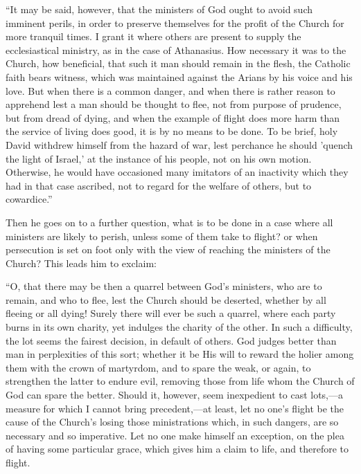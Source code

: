 ``It may be said, however, that the ministers of God ought to
avoid such imminent perils, in order to preserve themselves for the
profit of the Church for more tranquil times. I grant it where others
are present to supply the ecclesiastical
ministry, as in the case of Athanasius. How necessary it was to the
Church, how beneficial, that such it man should remain in the flesh,
the Catholic faith bears witness, which was maintained against the
Arians by his voice and his love. But when there is a common danger,
and when there is rather reason to apprehend lest a man should be
thought to flee, not from purpose of prudence, but from dread of
dying, and when the example of flight does more harm than the service
of living does good, it is by no means to be done. To be brief, holy
David withdrew himself from the hazard of war, lest perchance he
should 'quench the light of Israel,' at the instance of his people,
not on his own motion. Otherwise, he would have occasioned many
imitators of an inactivity which they had in that case ascribed, not
to regard for the welfare of others, but to cowardice.''

Then he goes on to a further question, what is to be done in a case
where all ministers are likely to perish, unless some of them take to
flight? or when persecution is set on foot only with the view of
reaching the ministers of the Church? This leads him to exclaim:

``O, that there may be then a quarrel between God's ministers,
who are to remain, and who to flee, lest the Church should be
deserted, whether by all fleeing or all dying! Surely there will ever
be such a quarrel, where each party burns in its own charity, yet
indulges the charity of the other. In such a difficulty, the lot seems
the fairest decision, in default of others. God judges better than man
in perplexities of this sort; whether it be His will to
reward the holier among them with the crown of martyrdom, and to spare
the weak, or again, to strengthen the latter to endure evil, removing
those from life whom the Church of God can spare the better. Should
it, however, seem inexpedient to cast lots,—a measure for which I
cannot bring precedent,—at least, let no one's flight be the cause
of the Church's losing those ministrations which, in such dangers, are
so necessary and so imperative. Let no one make himself an exception,
on the plea of having some particular grace, which gives him a claim
to life, and therefore to flight.

